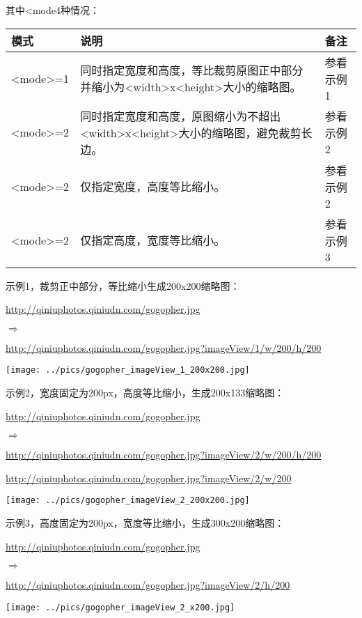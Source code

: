 \documentclass[11pt, oneside]{book}
\newcommand{\qpar}[1]{
\vspace{0.25em}
\noindent
#1\par
\vspace{0.25em}
}
\newcommand{\qurl}[1]{\url{#1}}
\newcommand{\qtable}[1]{\vspace{0.5em}#1\vspace{0.5em}}
\begin{document}
\begin{CJK*}{UTF8}{song}
\qpar{其中\textless mode4种情况：}
\qtable{
\def\arraystretch{1.5}
\begin{tabular}{|l|p{22em}|l|}
\hline
模式 & 说明 & 备注 \\
\hline
\textless mode\textgreater=1 & 同时指定宽度和高度，等比裁剪原图正中部分并缩小为\textless width\textgreater x\textless height\textgreater 大小的缩略图。& 参看示例1 \\
\hline
\textless mode\textgreater=2 & 同时指定宽度和高度，原图缩小为不超出\textless width\textgreater x\textless height\textgreater 大小的缩略图，避免裁剪长边。& 参看示例2 \\
\hline
\textless mode\textgreater=2 & 仅指定宽度，高度等比缩小。 & 参看示例2 \\
\hline
\textless mode\textgreater=2 & 仅指定高度，宽度等比缩小。 & 参看示例3 \\
\hline
\end{tabular}
}

\clearpage

\qpar{示例1，裁剪正中部分，等比缩小生成200x200缩略图：}
\qpar{\qurl{http://qiniuphotos.qiniudn.com/gogopher.jpg}}
\qpar{$\Rightarrow$}
\qpar{\qurl{http://qiniuphotos.qiniudn.com/gogopher.jpg?imageView/1/w/200/h/200}}

\begin{center}
\texttt{[image: ../pics/gogopher\_imageView\_1\_200x200.jpg]}
\end{center}

\qpar{示例2，宽度固定为200px，高度等比缩小，生成200x133缩略图：}
\qpar{\qurl{http://qiniuphotos.qiniudn.com/gogopher.jpg}}
\qpar{$\Rightarrow$}
\qpar{\qurl{http://qiniuphotos.qiniudn.com/gogopher.jpg?imageView/2/w/200/h/200}}
\qpar{\qurl{http://qiniuphotos.qiniudn.com/gogopher.jpg?imageView/2/w/200}}

\begin{center}
\texttt{[image: ../pics/gogopher\_imageView\_2\_200x200.jpg]}
\end{center}

\clearpage

\qpar{示例3，高度固定为200px，宽度等比缩小，生成300x200缩略图：}
\qpar{\qurl{http://qiniuphotos.qiniudn.com/gogopher.jpg}}
\qpar{$\Rightarrow$}
\qpar{\qurl{http://qiniuphotos.qiniudn.com/gogopher.jpg?imageView/2/h/200}}

\begin{center}
\texttt{[image: ../pics/gogopher\_imageView\_2\_x200.jpg]}
\end{center}

\end{CJK*}
\end{document}
